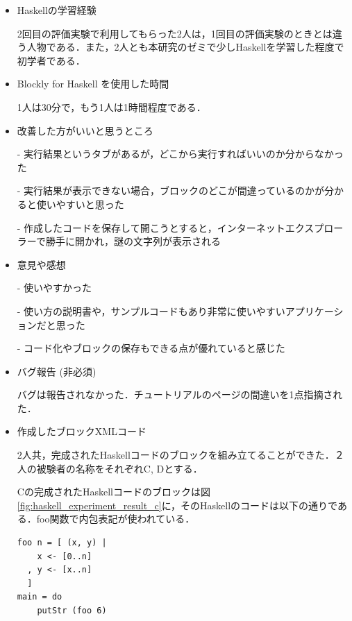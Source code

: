 \documentclass{risepaper}
\begin{document}
\begin{itemize}
\item Haskellの学習経験

2回目の評価実験で利用してもらった2人は，1回目の評価実験のときとは違う人物である．また，2人とも本研究のゼミで少しHaskellを学習した程度で初学者である．

\item Blockly for Haskell を使用した時間

1人は30分で，もう1人は1時間程度である．

\item 改善した方がいいと思うところ

- 実行結果というタブがあるが，どこから実行すればいいのか分からなかった

- 実行結果が表示できない場合，ブロックのどこが間違っているのかが分かると使いやすいと思った

- 作成したコードを保存して開こうとすると，インターネットエクスプローラーで勝手に開かれ，謎の文字列が表示される

\item 意見や感想

- 使いやすかった

- 使い方の説明書や，サンプルコードもあり非常に使いやすいアプリケーションだと思った

- コード化やブロックの保存もできる点が優れていると感じた

\item バグ報告 (非必須)

バグは報告されなかった．チュートリアルのページの間違いを1点指摘された．

\item 作成したブロックXMLコード

2人共，完成されたHaskellコードのブロックを組み立てることができた．２人の被験者の名称をそれぞれC, Dとする．

Cの完成されたHaskellコードのブロックは図\ref{fig:haskell_experiment_result_c}に，そのHaskellのコードは以下の通りである．foo関数で内包表記が使われている．
\begin{lstlisting}[basicstyle=\ttfamily\footnotesize]
foo n = [ (x, y) |
    x <- [0..n]
  , y <- [x..n]
  ]
main = do
    putStr (foo 6)
\end{lstlisting}


\end{itemize}
\end{document}
